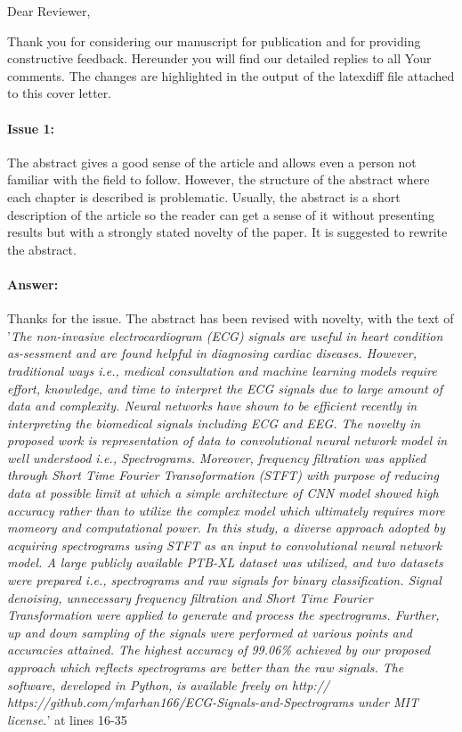 \documentclass{article}
\begin{document}
Dear Reviewer,

\vspace{0.25in}

Thank you for considering our manuscript for publication and for providing constructive feedback.
Hereunder you will find our detailed replies to all Your comments.
The changes are highlighted in the output of the latexdiff file attached to this cover letter.

\paragraph{Issue 1:}
\begin{displayquote}
The abstract gives a good sense of the article and allows even a person not familiar with the field to follow. However, the structure of the abstract where each chapter is described is problematic. Usually, the abstract is a short description of the article so the reader can get a sense of it without presenting results but with a strongly stated novelty of the paper. It is suggested to rewrite the abstract.
\end{displayquote}

\paragraph{Answer:}
Thanks for the issue. The abstract has been revised with novelty, with the text of '\textit{The non-invasive electrocardiogram (ECG) signals are useful in heart condition as-sessment and are found helpful in diagnosing cardiac diseases. However, traditional ways i.e., medical consultation and machine learning models require effort, knowledge, and time to interpret the ECG signals due to large amount of data and complexity. Neural networks have shown to be efficient recently in interpreting the biomedical signals including ECG and EEG. The novelty in proposed work is representation of data to convolutional neural network model in well understood i.e., Spectrograms. Moreover, frequency filtration was applied through Short Time Fourier Transoformation (STFT) with purpose of reducing data at possible limit at which a simple architecture of CNN model showed high accuracy rather than to utilize the complex model which ultimately requires more momeory and computational power. In this study, a diverse approach adopted by acquiring spectrograms using STFT as an input to convolutional neural network model. A large publicly available PTB-XL dataset was utilized, and two datasets were prepared i.e., spectrograms and raw signals for binary classification. Signal denoising, unnecessary frequency filtration and Short Time Fourier Transformation were applied to generate and process the spectrograms. Further, up and down sampling of the signals were performed at various points and accuracies attained. The highest accuracy of 99.06\% achieved by our proposed approach which reflects spectrograms are better than the raw signals. The software, developed in Python, is available freely on http:// https://github.com/mfarhan166/ECG-Signals-and-Spectrograms under MIT license.}' at lines 16-35
\end{document}
